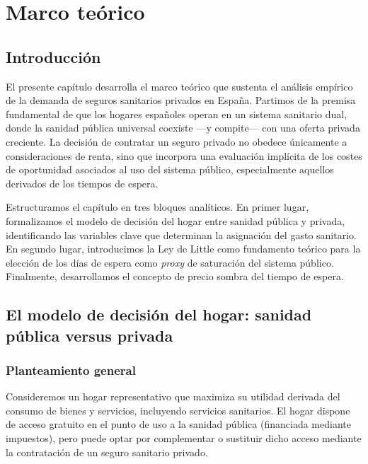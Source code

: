 \chapter{Marco teórico}
\label{cap:teoria}

\section{Introducción}

El presente capítulo desarrolla el marco teórico que sustenta el análisis empírico
de la demanda de seguros sanitarios privados en España. Partimos de la premisa
fundamental de que los hogares españoles operan en un sistema sanitario dual,
donde la sanidad pública universal coexiste ---y compite--- con una oferta privada
creciente. La decisión de contratar un seguro privado no obedece únicamente a
consideraciones de renta, sino que incorpora una evaluación implícita de los
costes de oportunidad asociados al uso del sistema público, especialmente aquellos
derivados de los tiempos de espera.

Estructuramos el capítulo en tres bloques analíticos. En primer lugar,
formalizamos el modelo de decisión del hogar entre sanidad pública y privada,
identificando las variables clave que determinan la asignación del gasto sanitario.
En segundo lugar, introducimos la Ley de Little como fundamento teórico para la
elección de los días de espera como \textit{proxy} de saturación del sistema
público. Finalmente, desarrollamos el concepto de precio sombra del tiempo de
espera.

\section{El modelo de decisión del hogar: sanidad pública versus privada}

\subsection{Planteamiento general}

Consideremos un hogar representativo que maximiza su utilidad derivada del consumo
de bienes y servicios, incluyendo servicios sanitarios. El hogar dispone de acceso
gratuito en el punto de uso a la sanidad pública (financiada mediante impuestos),
pero puede optar por complementar o sustituir dicho acceso mediante la contratación
de un seguro sanitario privado.

